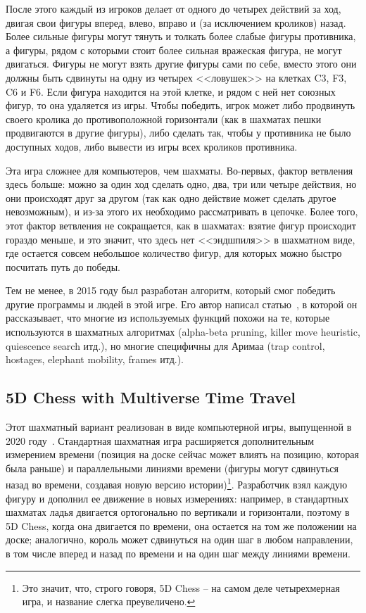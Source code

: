 \documentclass{article}
\begin{document}
После этого каждый из игроков делает от одного до четырех действий за ход,
двигая свои фигуры вперед, влево, вправо и (за исключением кроликов) назад.
Более сильные фигуры могут тянуть и толкать более слабые фигуры противника,
а фигуры, рядом с которыми стоит более сильная вражеская фигура, не могут двигаться.
Фигуры не могут взять другие фигуры сами по себе,
вместо этого они должны быть сдвинуты на одну из четырех <<ловушек>> на клетках C3, F3, C6 и F6.
Если фигура находится на этой клетке, и рядом с ней нет союзных фигур,
то она удаляется из игры.
Чтобы победить, игрок может либо продвинуть своего кролика до противоположной горизонтали
(как в шахматах пешки продвигаются в другие фигуры),
либо сделать так, чтобы у противника не было доступных ходов,
либо вывести из игры всех кроликов противника.

Эта игра сложнее для компьютеров, чем шахматы.
Во-первых, фактор ветвления здесь больше:
можно за один ход сделать одно, два, три или четыре действия,
но они происходят друг за другом (так как одно действие может сделать другое невозможным),
и из-за этого их необходимо рассматривать в цепочке.
Более того, этот фактор ветвления не сокращается, как в шахматах:
взятие фигур происходит гораздо меньше,
и это значит, что здесь нет <<эндшпиля>> в шахматном виде,
где остается совсем небольшое количество фигур,
для которых можно быстро посчитать путь до победы.

Тем не менее, в 2015 году был разработан алгоритм, который смог победить другие программы
и людей в этой игре. Его автор написал статью~\cite{arimaa-program}, в которой
он рассказывает, что многие из используемых функций похожи на те,
которые используются в шахматных алгоритмах (alpha-beta pruning, killer move heuristic, quiescence search итд.),
но многие специфичны для Аримаа (trap control, hostages, elephant mobility, frames итд.).

\subsection{5D Chess with Multiverse Time Travel}

Этот шахматный вариант реализован в виде компьютерной игры, выпущенной в 2020 году~\cite{5dchess-steam}.
Стандартная шахматная игра расширяется дополнительным измерением времени (позиция на доске сейчас может влиять на позицию, которая была раньше)
и параллельными линиями времени (фигуры могут сдвинуться назад во времени, создавая новую версию истории)\footnote{
    Это значит, что, строго говоря, 5D Chess -- на самом деле четырехмерная игра,
    и название слегка преувеличено.
}.
Разработчик взял каждую фигуру и дополнил ее движение в новых измерениях: 
например, в стандартных шахматах ладья двигается ортогонально по вертикали и горизонтали,
поэтому в 5D Chess, когда она двигается по времени, она остается на том же положении на доске;
аналогично, король может сдвинуться на один шаг в любом направлении, в том числе вперед и назад по времени
и на один шаг между линиями времени.
\end{document}
